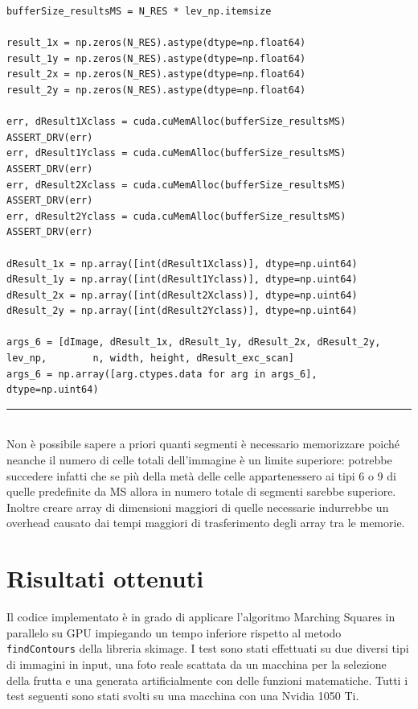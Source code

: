 \documentclass[12pt,a4paper]{report}
\begin{document}
{\begin{lstlisting}
bufferSize_resultsMS = N_RES * lev_np.itemsize

result_1x = np.zeros(N_RES).astype(dtype=np.float64)
result_1y = np.zeros(N_RES).astype(dtype=np.float64)
result_2x = np.zeros(N_RES).astype(dtype=np.float64)
result_2y = np.zeros(N_RES).astype(dtype=np.float64)

err, dResult1Xclass = cuda.cuMemAlloc(bufferSize_resultsMS)
ASSERT_DRV(err)
err, dResult1Yclass = cuda.cuMemAlloc(bufferSize_resultsMS)
ASSERT_DRV(err)
err, dResult2Xclass = cuda.cuMemAlloc(bufferSize_resultsMS)
ASSERT_DRV(err)
err, dResult2Yclass = cuda.cuMemAlloc(bufferSize_resultsMS)
ASSERT_DRV(err)

dResult_1x = np.array([int(dResult1Xclass)], dtype=np.uint64)
dResult_1y = np.array([int(dResult1Yclass)], dtype=np.uint64)
dResult_2x = np.array([int(dResult2Xclass)], dtype=np.uint64)
dResult_2y = np.array([int(dResult2Yclass)], dtype=np.uint64)

args_6 = [dImage, dResult_1x, dResult_1y, dResult_2x, dResult_2y, lev_np,        n, width, height, dResult_exc_scan]
args_6 = np.array([arg.ctypes.data for arg in args_6], dtype=np.uint64)
\end{lstlisting}
\noindent\rule[0.5ex]{\linewidth}{1pt} \\[6pt]
Non è possibile sapere a priori quanti segmenti è necessario memorizzare poiché neanche il numero di celle totali dell'immagine è un limite superiore: potrebbe succedere infatti che se più della metà delle celle appartenessero ai tipi 6 o 9 di quelle predefinite da MS allora in numero totale di segmenti sarebbe superiore. Inoltre creare array di dimensioni maggiori di quelle necessarie indurrebbe un overhead causato dai tempi maggiori di trasferimento degli array tra le memorie.

\newpage

\chapter{Risultati ottenuti}
Il codice implementato è in grado di applicare l'algoritmo Marching Squares in parallelo su GPU impiegando un tempo inferiore rispetto al metodo \verb|findContours| della libreria skimage. \newline
I test sono stati effettuati su due diversi tipi di immagini in input, una foto reale scattata da un macchina per la selezione della frutta e una generata artificialmente con delle funzioni matematiche.
Tutti i test seguenti sono stati svolti su una macchina con una Nvidia 1050 Ti.

}
\end{document}
